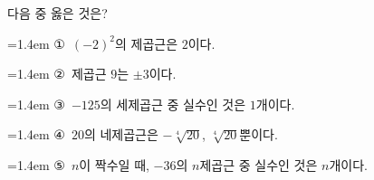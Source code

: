 다음 중 옳은 것은?
\par\medskip\par\noindent\hangindent=1.4em {\small ①}\ $(-2)^2$의 제곱근은 $2$이다.\par\noindent\hangindent=1.4em {\small ②}\ 제곱근 $9$는 $\pm 3$이다.\par\noindent\hangindent=1.4em {\small ③}\ $-125$의 세제곱근 중 실수인 것은 $1$개이다.\par\noindent\hangindent=1.4em {\small ④}\ $20$의 네제곱근은 $-\sqrt[4]{20}$, $\sqrt[4]{20}$뿐이다.\par\noindent\hangindent=1.4em {\small ⑤}\ $n$이 짝수일 때, $-36$의 $n$제곱근 중 실수인 것은 $n$개이다.\par\medskip
